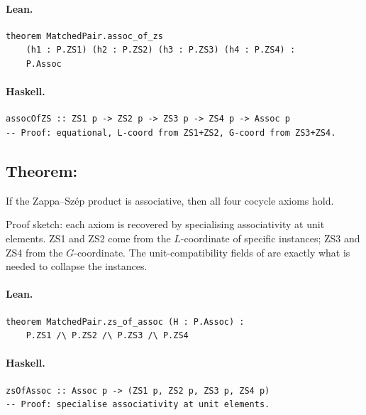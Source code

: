 \documentclass[11pt,a4paper]{article}
\begin{document}
\paragraph{Lean.}
\begin{lstlisting}[style=lean]
theorem MatchedPair.assoc_of_zs
    (h1 : P.ZS1) (h2 : P.ZS2) (h3 : P.ZS3) (h4 : P.ZS4) :
    P.Assoc
\end{lstlisting}

\paragraph{Haskell.}
\begin{lstlisting}[style=haskell]
assocOfZS :: ZS1 p -> ZS2 p -> ZS3 p -> ZS4 p -> Assoc p
-- Proof: equational, L-coord from ZS1+ZS2, G-coord from ZS3+ZS4.
\end{lstlisting}


\subsection{Theorem: }

\begin{thm}
If the Zappa--Sz\'{e}p product is associative, then all four cocycle axioms hold.

Proof sketch: each axiom is recovered by specialising associativity at unit
elements.  ZS1 and ZS2 come from the $L$-coordinate of specific instances;
ZS3 and ZS4 from the $G$-coordinate.  The unit-compatibility fields of
 are exactly what is needed to collapse the instances.
\end{thm}

\paragraph{Lean.}
\begin{lstlisting}[style=lean]
theorem MatchedPair.zs_of_assoc (H : P.Assoc) :
    P.ZS1 /\ P.ZS2 /\ P.ZS3 /\ P.ZS4
\end{lstlisting}

\paragraph{Haskell.}
\begin{lstlisting}[style=haskell]
zsOfAssoc :: Assoc p -> (ZS1 p, ZS2 p, ZS3 p, ZS4 p)
-- Proof: specialise associativity at unit elements.
\end{lstlisting}
\end{document}
